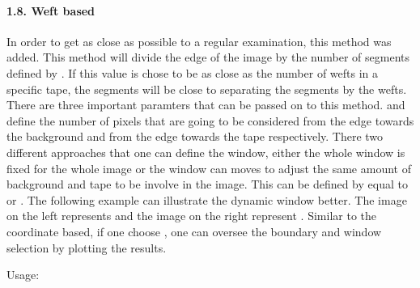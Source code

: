 \documentclass[letterpaper,10pt,english]{sphinxmanual}
\begin{document}
\noindent{}


\paragraph{1.8. Weft based}
\label{\detokenize{tutorials:weft-based}}
\sphinxAtStartPar
In order to get as close as possible to a regular examination, this method was
added. This method will divide the edge of the image by the number of segments
defined by . If this value is chose to be as close as the number of
wefts in a specific tape, the segments will be close to separating the segments
by the wefts. There are three important paramters that can be passed on to this
method.  and  define the number of pixels
that are going to be considered from the edge towards the background and from the
edge towards the tape respectively. There two different approaches that one can
define the window, either the whole window is fixed for the whole image or the window
can moves to adjust the same amount of background and tape to be involve in the image.
This can be defined by  equal to  or . The
following example can illustrate the dynamic window better. The image on the left
represents  and the image on the right represent .
Similar to the coordinate based, if one choose , one can oversee the
boundary and window selection by plotting the results.

\sphinxAtStartPar
Usage:

\begin{sphinxVerbatim}[commandchars=\\\{\}]
\end{sphinxVerbatim}
\end{document}
